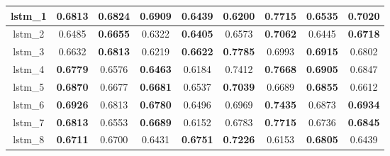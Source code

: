 \begin{table}[p]
\begin{tabular}{|c|c|c|c|c|c|c|c|c|}
        lstm\_1  & 0.6813                              & \textbf{0.6824}                     & \textbf{\cellcolor{green!50}0.6909} & 0.6439                              & 0.6200                              & \textbf{0.7715}                     & 0.6535                              & \textbf{\cellcolor{green!50}0.7020} \\ \hline
        lstm\_2  & 0.6485                              & \textbf{0.6655}                     & 0.6322                              & \textbf{0.6405}                     & 0.6573                              & \textbf{0.7062}                     & 0.6445                              & \textbf{0.6718}                     \\ \hline
        lstm\_3  & 0.6632                              & \textbf{0.6813}                     & 0.6219                              & \textbf{0.6622}                     & \textbf{\cellcolor{green!50}0.7785} & 0.6993                              & \textbf{\cellcolor{green!50}0.6915} & 0.6802                              \\ \hline
        lstm\_4  & \textbf{0.6779}                     & 0.6576                              & \textbf{0.6463}                     & 0.6184                              & 0.7412                              & \textbf{0.7668}                     & \textbf{0.6905}                     & 0.6847                              \\ \hline
        lstm\_5  & \textbf{0.6870}                     & 0.6677                              & \textbf{0.6681}                     & 0.6537                              & \textbf{0.7039}                     & 0.6689                              & \textbf{0.6855}                     & 0.6612                              \\ \hline
        lstm\_6  & \textbf{\cellcolor{green!50}0.6926} & 0.6813                              & \textbf{0.6780}                     & 0.6496                              & 0.6969                              & \textbf{0.7435}                     & 0.6873                              & \textbf{0.6934}                     \\ \hline
        lstm\_7  & \textbf{0.6813}                     & 0.6553                              & \textbf{0.6689}                     & 0.6152                              & 0.6783                              & \textbf{0.7715}                     & 0.6736                              & \textbf{0.6845}                     \\ \hline
        lstm\_8  & \textbf{0.6711}                     & 0.6700                              & 0.6431                              & \textbf{0.6751}                     & \textbf{0.7226}                     & 0.6153                              & \textbf{0.6805}                     & 0.6439                              \\ \hline

\end{tabular}
\end{table}
